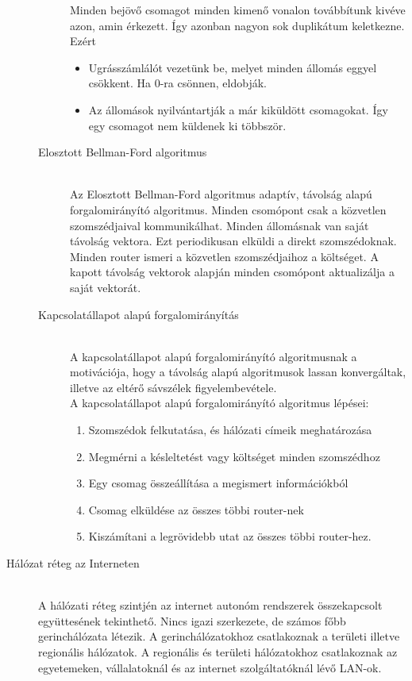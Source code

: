 \documentclass[margin=0px]{article}
\begin{document}
\begin{description}
\begin{description}
						Minden bejövő csomagot minden kimenő vonalon továbbítunk kivéve azon, amin érkezett. Így azonban nagyon sok duplikátum keletkezne. Ezért
						\begin{itemize}
							\item Ugrásszámlálót vezetünk be, melyet minden állomás eggyel csökkent. Ha 0-ra csönnen, eldobják.
							\item Az állomások nyilvántartják a már kiküldött csomagokat. Így egy csomagot nem küldenek ki többször.
						\end{itemize}
					\item[Elosztott Bellman-Ford algoritmus] \hfill \\
						Az Elosztott Bellman-Ford algoritmus adaptív, távolság alapú forgalomirányító algoritmus. Minden csomópont csak a közvetlen szomszédjaival kommunikálhat. Minden állomásnak van saját távolság vektora. Ezt periodikusan elküldi a direkt szomszédoknak. Minden router ismeri a közvetlen szomszédjaihoz a költséget. A kapott távolság vektorok alapján minden csomópont aktualizálja a saját vektorát. 
					\item[Kapcsolatállapot alapú forgalomirányítás] \hfill \\
						A kapcsolatállapot alapú forgalomirányító algoritmusnak a motivációja, hogy a távolság alapú algoritmusok lassan konvergáltak, illetve az eltérő sávszélek figyelembevétele. \\
						A kapcsolatállapot alapú forgalomirányító algoritmus lépései:
						\begin{enumerate}
							\item Szomszédok felkutatása, és hálózati címeik meghatározása
							\item Megmérni a késleltetést vagy költséget minden szomszédhoz
							\item Egy csomag összeállítása a megismert információkból
							\item Csomag elküldése az összes többi router-nek
							\item Kiszámítani a legrövidebb utat az összes többi router-hez.
						\end{enumerate}
				\end{description}
			\item[Hálózat réteg az Interneten] \hfill \\
				A hálózati réteg szintjén az internet autonóm rendszerek összekapcsolt együttesének tekinthető. Nincs igazi szerkezete, de számos főbb gerinchálózata létezik. A gerinchálózatokhoz csatlakoznak a területi illetve regionális hálózatok. A regionális és területi hálózatokhoz csatlakoznak az egyetemeken, vállalatoknál és az internet szolgáltatóknál lévő LAN-ok.
				

\end{description}
\end{document}
